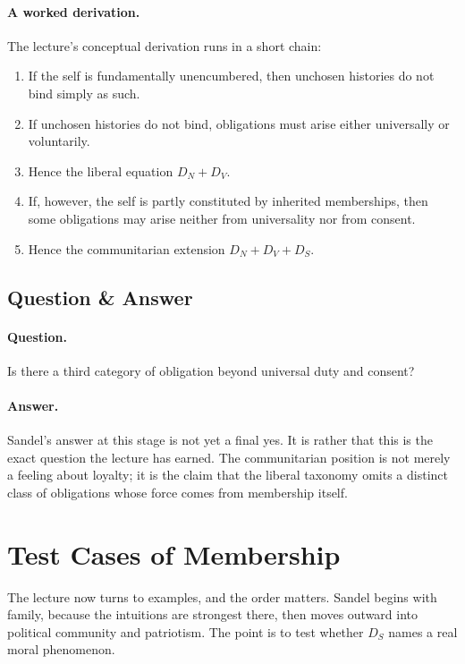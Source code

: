 \paragraph{A worked derivation.}
The lecture's conceptual derivation runs in a short chain:
\begin{enumerate}
\item If the self is fundamentally unencumbered, then unchosen histories do not bind simply as such.
\item If unchosen histories do not bind, obligations must arise either universally or voluntarily.
\item Hence the liberal equation \(D_N + D_V\).
\item If, however, the self is partly constituted by inherited memberships, then some obligations may arise neither from universality nor from consent.
\item Hence the communitarian extension \(D_N + D_V + D_S\).
\end{enumerate}

\subsection{Question \& Answer}

\paragraph{Question.} Is there a third category of obligation beyond universal duty and consent?

\paragraph{Answer.} Sandel's answer at this stage is not yet a final yes. It is rather that this is the exact question the lecture has earned. The communitarian position is not merely a feeling about loyalty; it is the claim that the liberal taxonomy omits a distinct class of obligations whose force comes from membership itself.

\section{Test Cases of Membership}

The lecture now turns to examples, and the order matters. Sandel begins with family, because the intuitions are strongest there, then moves outward into political community and patriotism. The point is to test whether \(D_S\) names a real moral phenomenon.

